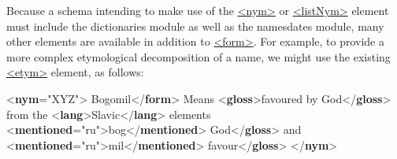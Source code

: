Because a schema intending to make use of the \hyperref[TEI.nym]{<nym>} or \hyperref[TEI.listNym]{<listNym>} element must include the \textsf{dictionaries} module as well as the \textsf{namesdates} module, many other elements are available in addition to \hyperref[TEI.form]{<form>}. For example, to provide a more complex etymological decomposition of a name, we might use the existing \hyperref[TEI.etym]{<etym>} element, as follows: \par\bgroup{}\exampleFont \begin{shaded}\noindent\mbox{}{<\textbf{nym}\hspace*{1em}{xml:id}="{XYZ}">}\mbox{}\newline 
{}Bogomil{</\textbf{form}>}\mbox{}\newline 
{}Means {<\textbf{gloss}>}favoured by God{</\textbf{gloss}>} from the {<\textbf{lang}>}Slavic{</\textbf{lang}>} elements {<\textbf{mentioned}\hspace*{1em}{xml:lang}="{ru}">}bog{</\textbf{mentioned}>}\mbox{}\newline 
\hspace*{1em}God{</\textbf{gloss}>} and {<\textbf{mentioned}\hspace*{1em}{xml:lang}="{ru}">}mil{</\textbf{mentioned}>}\mbox{}\newline 
\hspace*{1em}favour{</\textbf{gloss}>}\mbox{}\newline 
{}\mbox{}\newline 
{</\textbf{nym}>}\end{shaded}\egroup\par \par
